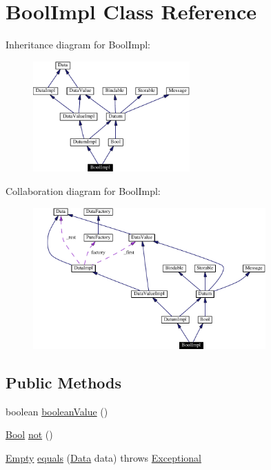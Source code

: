 \hypertarget{classBoolImpl}{
\section{Bool\-Impl  Class Reference}
\label{classBoolImpl}
}
Inheritance diagram for Bool\-Impl:\begin{figure}[H]
\begin{center}
\leavevmode
\includegraphics[width=170pt]{classBoolImpl__inherit__graph}
\end{center}
\end{figure}
Collaboration diagram for Bool\-Impl:\begin{figure}[H]
\begin{center}
\leavevmode
\includegraphics[width=253pt]{classBoolImpl__coll__graph}
\end{center}
\end{figure}
\subsection*{Public Methods}
\begin{CompactItemize}
\item 
boolean \hyperlink{classBoolImpl_a0}{boolean\-Value} ()
\item 
\hyperlink{interfaceBool}{Bool} \hyperlink{classBoolImpl_a1}{not} ()
\item 
\hyperlink{interfaceEmpty}{Empty} \hyperlink{classBoolImpl_a2}{equals} (\hyperlink{interfaceData}{Data} data) throws \hyperlink{classExceptional}{Exceptional}
\end{CompactItemize}


